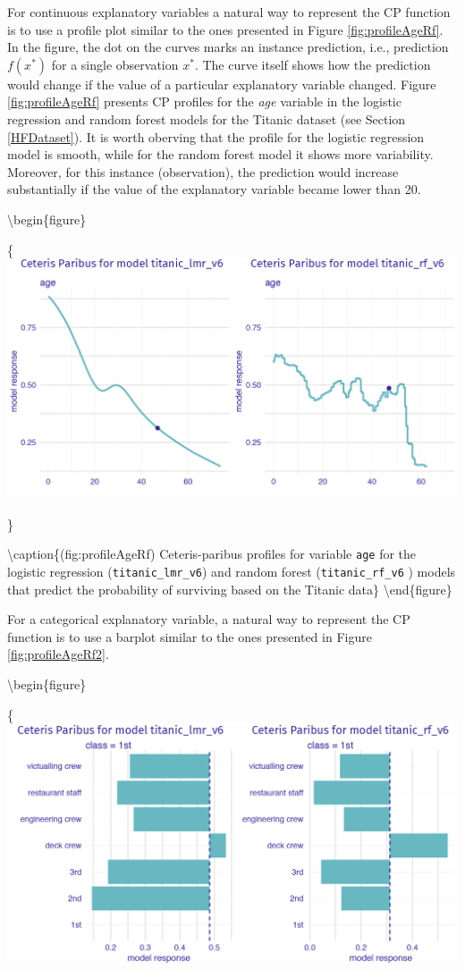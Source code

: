 \documentclass[12pt,]{krantz}
\theoremstyle{definition}
\theoremstyle{definition}
\theoremstyle{definition}
\theoremstyle{remark}
\begin{document}
For continuous explanatory variables a natural way to represent the CP
function is to use a profile plot similar to the ones presented in
Figure \ref{fig:profileAgeRf}. In the figure, the dot on the curves
marks an instance prediction, i.e., prediction \(f(x^*)\) for a single
observation \(x^*\). The curve itself shows how the prediction would
change if the value of a particular explanatory variable changed. Figure
\ref{fig:profileAgeRf} presents CP profiles for the \emph{age} variable
in the logistic regression and random forest models for the Titanic
dataset (see Section \ref{HFDataset}). It is worth oberving that the
profile for the logistic regression model is smooth, while for the
random forest model it shows more variability. Moreover, for this
instance (observation), the prediction would increase substantially if
the value of the explanatory variable became lower than 20.

\textbackslash{}begin\{figure\}

\{\centering \includegraphics[width=0.7\linewidth]{figure/profile_age_rf}

\}

\textbackslash{}caption\{(fig:profileAgeRf) Ceteris-paribus profiles for
variable \texttt{age} for the logistic regression
(\texttt{titanic\_lmr\_v6}) and random forest (\texttt{titanic\_rf\_v6}
) models that predict the probability of surviving based on the Titanic
data\}\label{fig:profileAgeRf} \textbackslash{}end\{figure\}

For a categorical explanatory variable, a natural way to represent the
CP function is to use a barplot similar to the ones presented in Figure
\ref{fig:profileAgeRf2}.

\textbackslash{}begin\{figure\}

\{\centering \includegraphics[width=0.7\linewidth]{figure/profile_class_rf}
\end{document}
